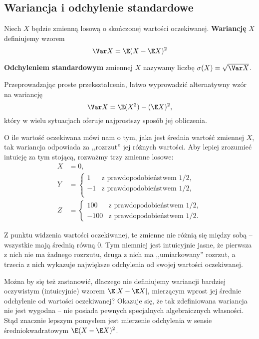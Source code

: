 \subsection{Wariancja i odchylenie standardowe}

Niech $X$ będzie zmienną losową o skończonej wartości oczekiwanej. \textbf{Wariancję} $X$ definiujemy wzorem
$$\Var X = \E (X - \E X)^2$$

\textbf{Odchyleniem standardowym} zmiennej $X$ nazywamy liczbę $\sigma(X) = \sqrt{\Var X}$.

Przeprowadzając proste przekształcenia, łatwo wyprowadzić alternatywny wzór na wariancję
$$\Var X = \E (X^2) - (\E X)^2,$$
który w wielu sytuacjach oferuje najprostszy sposób jej obliczenia.
\bigskip

O ile wartość oczekiwana mówi nam o tym, jaka jest średnia wartość zmiennej $X$, tak wariancja odpowiada za ,,rozrzut'' jej różnych wartości. Aby lepiej zrozumieć intuicję za tym stojącą, rozważmy trzy zmienne losowe:
\begin{align*}
    X &= 0, \\
    Y & = \begin{cases}
        1 & \text{z prawdopodobieństwem } 1/2, \\
        -1 & \text{z prawdopodobieństwem } 1/2, \\
    \end{cases} \\
    Z & = \begin{cases}
        100 & \text{z prawdopodobieństwem } 1/2, \\
        -100 & \text{z prawdopodobieństwem } 1/2.
    \end{cases}
\end{align*}

Z punktu widzenia wartości oczekiwanej, te zmienne nie różnią się między sobą -- wszystkie mają średnią równą 0. Tym niemniej jest intuicyjnie jasne, że pierwsza z nich nie ma żadnego rozrzutu, druga z nich ma ,,umiarkowany'' rozrzut, a trzecia z nich wykazuje największe odchylenia od swojej wartości oczekiwanej.

Można by się też zastanowić, dlaczego nie definiujemy wariancji bardziej oczywistym (intuicyjnie) wzorem $\E |X - \E X|$, mierzącym wprost jej średnie odchylenie od wartości oczekiwanej? Okazuje się, że tak zdefiniowana wariancja nie jest wygodna -- nie posiada pewnych specjalnych algebraicznych własności. Stąd znacznie lepszym pomysłem jest mierzenie odchylenia w sensie średniokwadratowym $\E (X - \E X)^2$.


